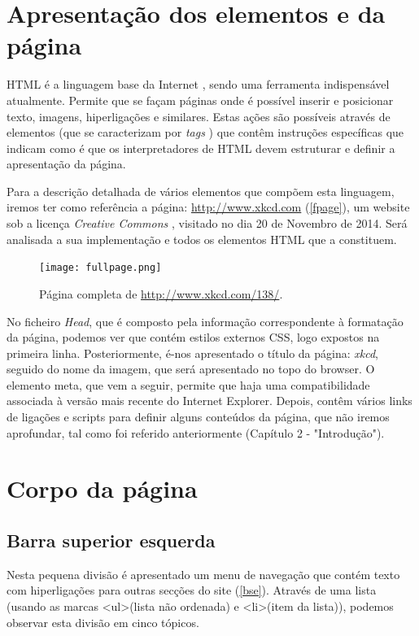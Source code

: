 \documentclass[11pt,openright,twoside]{report}
\begin{document}
\chapter{Apresentação dos elementos e da página}
HTML é a linguagem base da Internet \cite{Internetus}, sendo uma ferramenta indispensável atualmente. Permite que se façam páginas onde é possível inserir e posicionar texto, imagens, hiperligações e similares. Estas ações são possíveis através de elementos (que se caracterizam por \textit{tags} \cite{Tag}) que contêm instruções específicas que indicam como é que os interpretadores de HTML devem estruturar e definir a apresentação da página.
\smallskip 

Para a descrição detalhada de vários elementos que compõem esta linguagem, iremos ter como referência a página: \url{http://www.xkcd.com} (\autoref{fpage}), um website sob a licença \textit{Creative Commons} \cite{CreativeCommons}, visitado no dia 20 de Novembro de 2014. Será analisada a sua implementação e todos os elementos HTML que a constituem.
\smallskip


\begin{figure}
 \center
 \texttt{[image: fullpage.png]}
 \caption{Página completa de \url{http://www.xkcd.com/138/}.}
 \label{fpage}
\end{figure}


No ficheiro \textit{Head}, que é composto pela informação correspondente à formatação da página, podemos ver que contém estilos externos CSS, logo expostos na primeira linha. Posteriormente, é-nos apresentado o título da página: \textit{xkcd}, seguido do nome da imagem, que será apresentado no topo do browser. O elemento meta, que vem a seguir, permite que haja uma compatibilidade associada à versão mais recente do Internet Explorer. Depois, contêm vários links de ligações e scripts para definir alguns conteúdos da página, que não iremos aprofundar, tal como foi referido anteriormente (Capítulo 2 - "Introdução").

\chapter{Corpo da página}

\section{Barra superior esquerda}
Nesta pequena divisão é apresentado um menu de navegação que contém texto com hiperligações para outras secções do site (\autoref{bse}). Através de uma lista (usando as marcas \textless ul\textgreater (lista não ordenada) e \textless li\textgreater (item da lista)), podemos observar esta divisão em cinco tópicos.
\smallskip 
\end{document}
